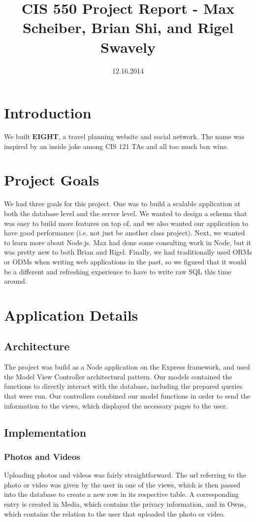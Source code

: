 \documentclass[11pt]{amsart}
\title{CIS 550 Project Report - Max Scheiber, Brian Shi, and Rigel Swavely}
\date{12.16.2014}
\begin{document}
\maketitle
\section{Introduction}
We built {\bf EIGHT}, a travel planning website and social network. The name was inspired by an
inside joke among CIS 121 TAs and all too much box wine.

\section{Project Goals}
We had three goals for this project. One was to build a scalable application at both the
database level and the server level. We wanted to design a schema that was easy to build more
features on top of, and we also wanted our application to have good performance (i.e. not just
be another class project). Next, we wanted to learn more about Node.js. Max had done some
consulting work in Node, but it was pretty new to both Brian and Rigel. Finally, we had
traditionally used ORMs or ODMs when writing web applications in the past, so we figured
that it would be a different and refreshing experience to have to write raw SQL this time around.

\section{Application Details}
\subsection{Architecture}
The project was build as a Node application on the Express framework, and used the Model View Controller 
architectural pattern. Our models contained the functions to directly interact with the database,
including the prepared queries that were run. Our controllers combined our model functions in order to 
send the information to the views, which displayed the necessary pages to the user. 
\subsection{Implementation}
\subsubsection{Photos and Videos}
Uploading photos and videos was fairly straightforward. The url referring to the photo or video was given by
the user in one of the views, which is then passed into the database to create a new row in its respective table.
A corresponding entry is created in Media, which contains the privacy information, and in Owns, which contains
the relation to the user that uploaded the photo or video.\\
\end{document}
